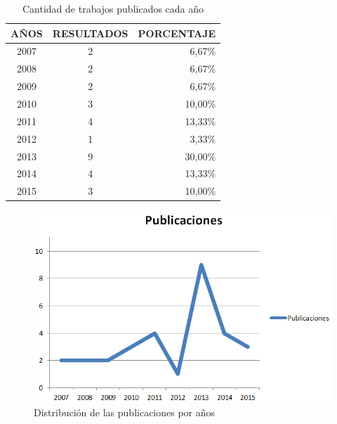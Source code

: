 
\begin{table}
  \begin{center}
  \begin{tabular}{| c | c | r |}
    \hline
    AÑOS & RESULTADOS & PORCENTAJE\\
    \hline    
    \hline
    2007 & 2 & 6,67\%\\
    \hline
    2008 & 2 & 6,67\%\\
    \hline
    2009 & 2 & 6,67\%\\
    \hline
    2010 & 3 & 10,00\%\\
    \hline
    2011 & 4 & 13,33\%\\
    \hline
    2012 & 1 & 3,33\%\\
    \hline
    2013 & 9 & 30,00\% \\
    \hline
    2014 & 4 & 13,33\%\\
    \hline
    2015 & 3 & 10,00\% \\
    \hline
  \end{tabular}
\end{center}
\caption{Cantidad de trabajos publicados cada año}
\label{tab:ResumenAniosResultados}
\end{table}

\begin{figure}
  \begin{center}
    \includegraphics[scale=0.4]{PublicacionesAnuales.png}
  \end{center}
  \caption{Distribución de las publicaciones por años}
  \label{fig:PublicacionesAnuales}
\end{figure}


